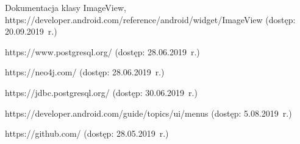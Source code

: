 \begin{thebibliography}{3}
   Dokumentacja klasy ImageView, https://developer.android.com/reference/android/widget/ImageView (dostęp: 20.09.2019~r.)
  
   https://www.postgresql.org/ (dostęp: 28.06.2019~r.)
  
   https://neo4j.com/ (dostęp: 28.06.2019~r.)
  
   https://jdbc.postgresql.org/ (dostęp: 30.06.2019~r.)
  
   https://developer.android.com/guide/topics/ui/menus (dostęp: 5.08.2019~r.)
  
   https://github.com/ (dostęp: 28.05.2019~r.)

  
\end{thebibliography}